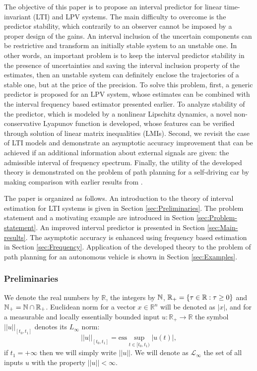 The objective of this paper is to propose an interval predictor for linear time-invariant (LTI) and LPV systems. The main difficulty to overcome is the predictor stability, which contrarily to an observer cannot be imposed by a proper design of the gains. An interval inclusion of the uncertain components can be restrictive and transform an initially stable system to an unstable one. In other words, an important problem is to keep the interval predictor stability in the presence of uncertainties and saving the interval inclusion property of the estimates, then an unstable system can definitely enclose the trajectories of a stable one, but at the price of the precision. To solve this problem, first, a generic predictor is proposed for an LPV system, whose estimates can be combined with the interval frequency based estimator presented earlier. To analyze stability of the predictor, which is modeled by a nonlinear Lipschitz dynamics, a novel non-conservative Lyapunov function is developed, whose features can be verified through solution of linear matrix inequalities (LMIs). Second, we revisit the case of LTI models and demonstrate an asymptotic accuracy improvement that can be achieved if an additional information about external signals are given: the admissible interval of frequency spectrum. Finally, the utility of the developed theory is demonstrated on the problem of path planning for a self-driving car by making comparison with earlier results from \cite{Leurent2018}.

The paper is organized as follows. An introduction to the theory of interval estimation for LTI systems is given in Section \ref{sec:Preliminaries}. The problem statement and a motivating example are introduced in Section \ref{sec:Problem-statement}. An improved interval predictor is presented in Section \ref{sec:Main-results}. The asymptotic accuracy is enhanced using frequency based estimation in Section \ref{sec:Frequency}. Application of the developed theory to the problem of path planning for an autonomous vehicle is shown in Section \ref{sec:Examples}.

\subsubsection{\label{sec:Preliminaries} Preliminaries}

We denote the real numbers  by $\mathbb{R}$, the integers by $\mathbb{N}$, $\mathbb{R}_{+}=\{\tau\in\mathbb{R}:\tau\ge0\}$ and $\mathbb{N}_{+}=\mathbb{N}\cap\mathbb{R}_{+}$. Euclidean norm for a vector $x\in\mathbb{R}^{n}$ will be denoted as $|x|$, and for a measurable and locally essentially bounded input $u:\mathbb{R}_{+}\to\mathbb{R}$ the symbol $||u||_{[t_{0},t_{1}]}$ denotes its $L_{\infty}$ norm:
\[
||u||_{[t_{0},t_{1}]}=\text{ess}\sup_{t\in[t_{0},t_{1})}|u(t)|,
\]
if $t_{1}=+\infty$ then we will simply write $||u||$. We will denote as $\mathcal{L}_{\infty}$ the set of all inputs $u$ with the property $||u||<\infty$. 


